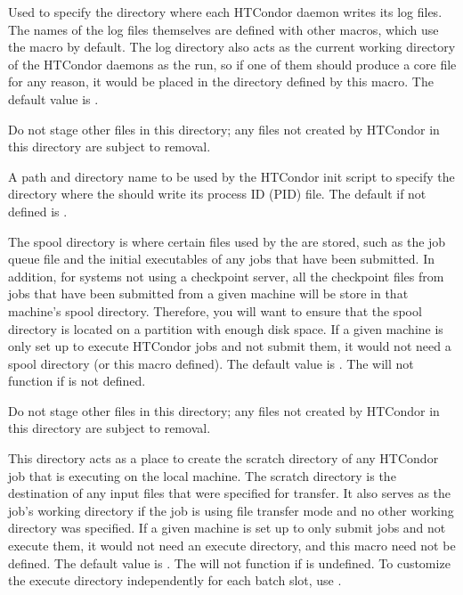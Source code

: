 \begin{description}
\label{param:Log}
\item[\Macro{LOG}]
  Used to specify the
  directory where each HTCondor daemon writes its log files.  The names
  of the log files themselves are defined with other macros, which use
  the  macro by default.  The log directory also acts as
  the current working directory of the HTCondor daemons as the run, so
  if one of them should produce a core file for any reason, it would
  be placed in the directory defined by this macro.
  The default value is .

  Do not stage other files in this directory;
  any files not created by HTCondor in this directory are subject to removal.

\label{param:Run}
\item[\Macro{RUN}]
  A path and directory name to be used by the HTCondor init script to 
  specify the directory where the  should write its process ID
  (PID) file. 
  The default if not defined is .
  
\label{param:Spool}
\item[\Macro{SPOOL}]
  The spool directory is where
  certain files used by the  are stored, such as the
  job queue file and the initial executables of any jobs that have
  been submitted.  In addition, for systems not using a checkpoint
  server, all the checkpoint files from jobs that have been submitted
  from a given machine will be store in that machine's spool
  directory.  Therefore, you will want to ensure that the spool
  directory is located on a partition with enough disk space.  If a
  given machine is only set up to execute HTCondor jobs and not submit
  them, it would not need a spool directory (or this macro defined).
  The default value is .
  The 
  will not function if  is not defined.

  Do not stage other files in this directory;
  any files not created by HTCondor in this directory are subject to removal.
  
\label{param:Execute}
\item[\Macro{EXECUTE}]
  This directory acts as
  a place to create the scratch directory of any HTCondor job that is executing
  on
  the local machine.  The scratch directory is the destination of
  any input files that were specified for transfer.  It also serves
  as the job's working directory if the job is using file transfer
  mode and no other working directory was specified.
  If a given machine is set up to only submit
  jobs and not execute them, it would not need an execute directory,
  and this macro need not be defined.
  The default value is .
  The  will not function if
   is undefined.
  To customize the execute
  directory independently for each batch slot, use .


\end{description}
